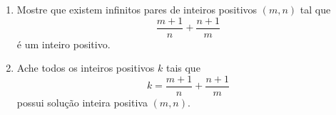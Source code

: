 \begin{enumerate}[label = (\alph*)]
	\item Mostre que existem infinitos pares de inteiros positivos $(m, n)$ tal que \[\frac{m+1}{n} + \frac{n+1}{m}\] é um inteiro positivo.
	\item Ache todos os inteiros positivos $k$ tais que \[k = \frac{m+1}{n} + \frac{n+1}{m}\] possui solução inteira positiva $(m, n)$.
\end{enumerate}
